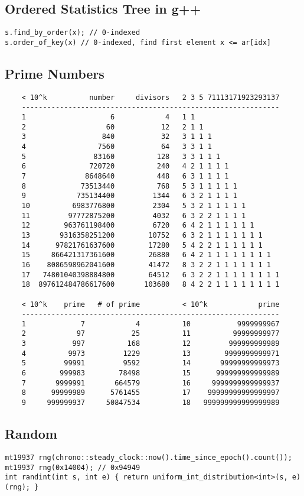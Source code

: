 \documentclass[landscape, 8pt, a4paper, oneside, twocolumn]{extarticle}
\begin{document}
\subsection {Ordered Statistics Tree in g++}
\begin{verbatim}
s.find_by_order(x); // 0-indexed
s.order_of_key(x) // 0-indexed, find first element x <= ar[idx]
\end{verbatim}
\subsection {Prime Numbers}
\begin{verbatim}
	< 10^k          number     divisors   2 3 5 71113171923293137
	-------------------------------------------------------------
	1                    6            4   1 1
	2                   60           12   2 1 1
	3                  840           32   3 1 1 1
	4                 7560           64   3 3 1 1
	5                83160          128   3 3 1 1 1
	6               720720          240   4 2 1 1 1 1
	7              8648640          448   6 3 1 1 1 1
	8             73513440          768   5 3 1 1 1 1 1
	9            735134400         1344   6 3 2 1 1 1 1
	10          6983776800         2304   5 3 2 1 1 1 1 1
	11         97772875200         4032   6 3 2 2 1 1 1 1
	12        963761198400         6720   6 4 2 1 1 1 1 1 1
	13       9316358251200        10752   6 3 2 1 1 1 1 1 1 1
	14      97821761637600        17280   5 4 2 2 1 1 1 1 1 1
	15     866421317361600        26880   6 4 2 1 1 1 1 1 1 1 1
	16    8086598962041600        41472   8 3 2 2 1 1 1 1 1 1 1
	17   74801040398884800        64512   6 3 2 2 1 1 1 1 1 1 1 1
	18  897612484786617600       103680   8 4 2 2 1 1 1 1 1 1 1 1

	< 10^k    prime   # of prime          < 10^k            prime
	-------------------------------------------------------------
	1             7            4          10           9999999967
	2            97           25          11          99999999977
	3           997          168          12         999999999989
	4          9973         1229          13        9999999999971
	5         99991         9592          14       99999999999973
	6        999983        78498          15      999999999999989
	7       9999991       664579          16     9999999999999937
	8      99999989      5761455          17    99999999999999997
	9     999999937     50847534          18   999999999999999989
\end{verbatim}
\subsection {Random}
\begin{verbatim}
mt19937 rng(chrono::steady_clock::now().time_since_epoch().count());
mt19937 rng(0x14004); // 0x94949
int randint(int s, int e) { return uniform_int_distribution<int>(s, e)(rng); }
\end{verbatim}
\end{document}
